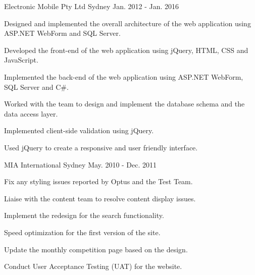 \begin{cventries}
  {Electronic Mobile Pty Ltd} %
  {Sydney} %
  {Jan. 2012 - Jan. 2016} %
  { \begin{cvitems} %
      \item {Designed and implemented the overall architecture of the web application using ASP.NET WebForm and SQL Server.} 
      \item {Developed the front-end of the web application using jQuery, HTML, CSS and JavaScript.} 
      \item {Implemented the back-end of the web application using ASP.NET WebForm, SQL Server and C\#.} 
      \item {Worked with the team to design and implement the database schema and the data access layer.} 
      \item {Implemented client-side validation using jQuery.} 
      \item {Used jQuery to create a responsive and user friendly interface.} 
    \end{cvitems} }

  {MIA International} %
  {Sydney} %
  {May. 2010 - Dec. 2011} %
  { \begin{cvitems} %
    \item {Fix any styling issues reported by Optus and the Test Team.}
    \item {Liaise with the content team to resolve content display issues.}
    \item {Implement the redesign for the search functionality.}
    \item {Speed optimization for the first version of the site.}
    \item {Update the monthly competition page based on the design.}
    \item {Conduct User Acceptance Testing (UAT) for the website.}
    \end{cvitems} }


\end{cventries}

